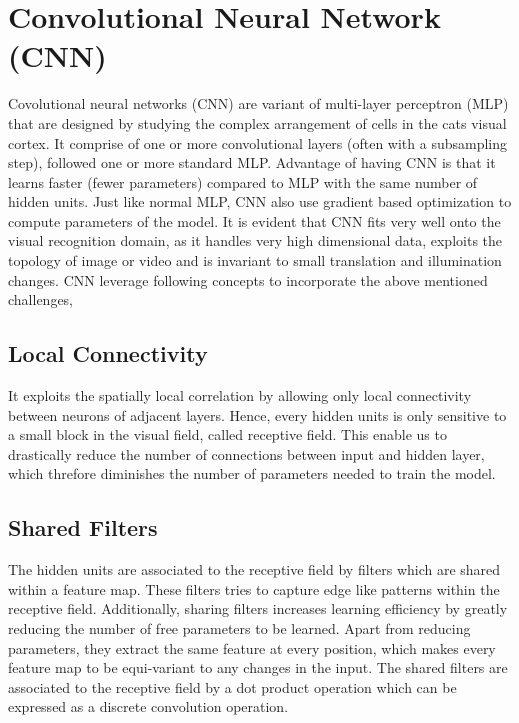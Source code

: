  \section{Convolutional Neural Network (CNN)}
 \label{sec:cnn}
 \par Covolutional neural networks (CNN) are variant of multi-layer perceptron (MLP) that are designed by studying the complex arrangement of cells in the cats visual cortex. It comprise of one or more convolutional layers (often with a subsampling step), followed one or more standard MLP.  Advantage of having CNN is that it learns faster (fewer parameters) compared to  MLP with the same number of hidden units. Just like normal MLP, CNN  also use  gradient based optimization to compute parameters of the model. It is  evident that CNN fits very well onto the visual recognition domain, as it handles very high dimensional data, exploits the topology of image or video and is invariant to small translation and illumination changes. 
CNN leverage following concepts to incorporate the above mentioned challenges,
\subsection{Local Connectivity}
It exploits the spatially local correlation by  allowing only local connectivity between neurons of adjacent layers. Hence, every hidden units is only sensitive to a small block in the visual field, called receptive field. This enable us to  drastically reduce the number of connections between input and hidden layer, which threfore diminishes the number of parameters needed to train the model.
\subsection{Shared Filters}
The hidden units are associated to the receptive field by filters which are shared within a feature map. These filters tries to capture edge like patterns within the receptive field. Additionally, sharing filters increases learning efficiency by greatly reducing the number of free parameters to be learned. Apart from reducing parameters, they extract the same feature at every position, which makes every feature map to be equi-variant to any changes in the input. The shared filters are associated to the receptive field by a dot product operation which can be expressed as a discrete convolution operation.
